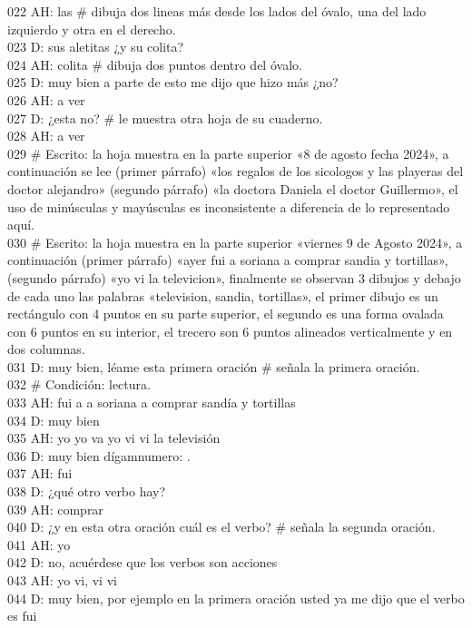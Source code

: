 022 AH: las \# dibuja dos lineas más desde los lados del óvalo, una del lado izquierdo y otra en el derecho.\\
023 D: sus aletitas ¿y su colita?\\
024 AH: colita \# dibuja dos puntos dentro del óvalo.\\
025 D: muy bien a parte de esto me dijo que hizo más ¿no?\\
026 AH: a ver\\
027 D: ¿esta no? \# le muestra otra hoja de su cuaderno.\\
028 AH: a ver\\
029 \# Escrito: la hoja muestra en la parte superior «8 de agosto fecha 2024», a continuación se lee (primer párrafo) «los regalos de los sicologos y las playeras del doctor alejandro» (segundo párrafo) «la doctora Daniela el doctor Guillermo», el uso de minúsculas y mayúsculas es inconsistente a diferencia de lo representado aquí.\\
030 \# Escrito: la hoja muestra en la parte superior «viernes 9  de Agosto 2024», a continuación (primer párrafo) «ayer fui a soriana a comprar sandia y tortillas», (segundo párrafo) «yo vi la televicion», finalmente se observan 3 dibujos y debajo de cada uno las palabras «television, sandia, tortillas», el primer dibujo es un rectángulo con 4 puntos en su parte superior, el segundo es una forma ovalada con 6 puntos en su interior, el trecero son 6 puntos alineados verticalmente y en dos columnas.\\
031 D: muy bien, léame esta primera oración \# señala la primera oración.\\
032 \# Condición: lectura.\\
033 AH: fui a a soriana a comprar sandía y tortillas\\
034 D: muy bien\\
035 AH: yo yo va yo vi vi la televisión\\
036 D: muy bien dígamnumero: .\\
037 AH: fui\\
038 D: ¿qué otro verbo hay?\\
039 AH: comprar\\
040 D: ¿y en esta otra oración cuál es el verbo? \# señala la segunda oración.\\
041 AH: yo\\
042 D: no, acuérdese que los verbos son acciones\\
043 AH: yo vi, vi vi\\
044 D: muy bien, por ejemplo en la primera oración usted ya me dijo que el verbo es fui\\
